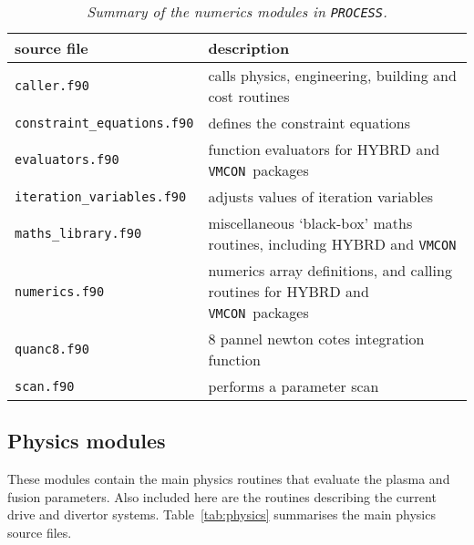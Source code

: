 \documentclass[11pt,a4paper]{report}
\newcommand{\process}{\mbox{\texttt{PROCESS}}}
\newcommand{\vmcon}{\mbox{\texttt{VMCON}}}
\begin{document}
\begin{table}[tbph]
\footnotesize
\begin{center}
\begin{tabular}{||l||l||} 
\hline
source file   & description \\ 
\hline
\texttt{caller.f90}                & calls physics, engineering, building and cost routines \\
\texttt{constraint\_equations.f90} & defines the constraint equations \\
\texttt{evaluators.f90}            & function evaluators for HYBRD and \vmcon\ packages \\
\texttt{iteration\_variables.f90}  & adjusts values of iteration variables \\
\texttt{maths\_library.f90}        & miscellaneous `black-box' maths routines,
including HYBRD and \vmcon \\
\texttt{numerics.f90}              & numerics array definitions, and calling routines for
HYBRD and \vmcon\ packages \\
\texttt{quanc8.f90}                & 8 pannel newton cotes integration function \\
\texttt{scan.f90}                  & performs a parameter scan \\
\hline
\end{tabular}
\end{center}
\caption[Summary of numerics modules]
{\label{tab:numerics}
  \textit{Summary of the numerics modules in \process.}
}
\end{table}

\subsection{Physics modules}

These modules contain the main physics routines that evaluate the plasma and
fusion parameters. Also included here are the routines describing the current
drive and divertor systems. Table~\ref{tab:physics} summarises the main physics
source files.
\end{document}
